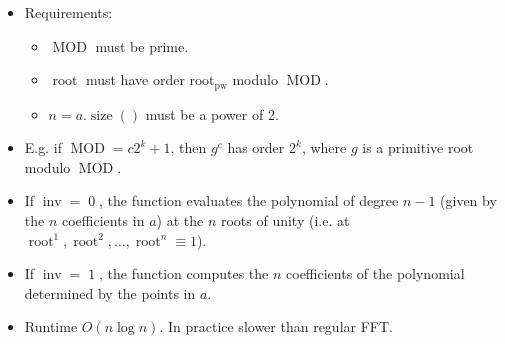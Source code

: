 \begin{itemize}
	\item Requirements:
	\begin{itemize}
		\item $\operatorname{MOD}$ must be prime.
		\item $\operatorname{root}$ must have order $\operatorname{root_{pw}}$ modulo $\operatorname{MOD}$.
		\item $n = a.\operatorname{size}()$ must be a power of 2.
	\end{itemize}
	\item E.g. if $\operatorname{MOD} = c2^k + 1$, then $g^c$ has order $2^k$, where $g$ is a primitive root modulo $\operatorname{MOD}$.
	\item If $\operatorname{inv} = \operatorname{0}$, the function evaluates the polynomial of degree $n - 1$ (given by the $n$ coefficients in $a$) at the $n$ roots of unity (i.e. at $\operatorname{root}^1, \operatorname{root}^2, \dots, \operatorname{root}^n \equiv 1$).
	\item If $\operatorname{inv} = \operatorname{1}$, the function computes the $n$ coefficients of the polynomial determined by the points in $a$.
	\item Runtime $O\left(n \log n\right)$. In practice slower than regular FFT.
\end{itemize}
